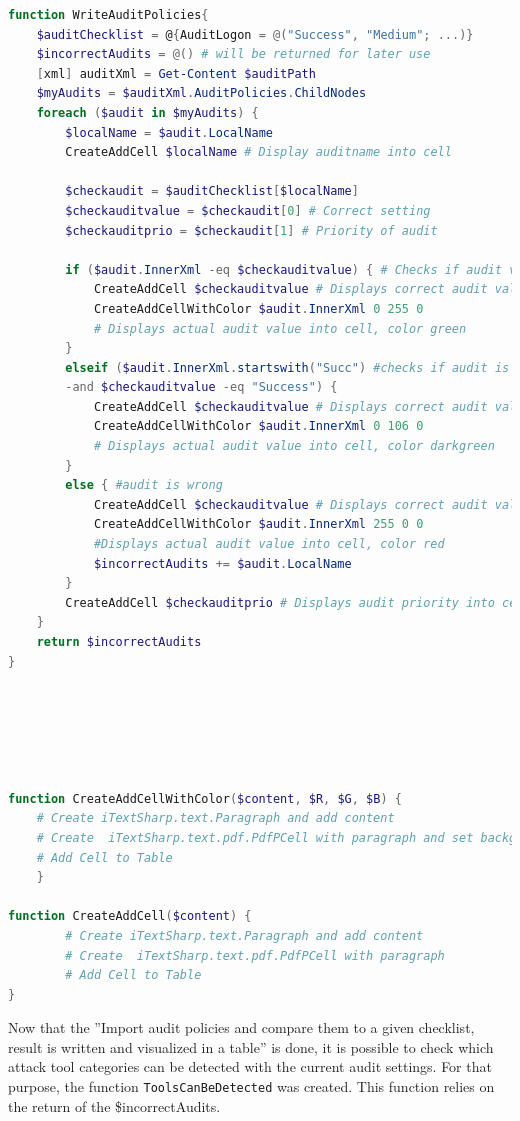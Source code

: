 \begin{lstlisting}[caption=Functions WriteAuditPolicies \& CreateAddCellWithColor \& CreateAddCell, language=PowerShell]
function WriteAuditPolicies{
    $auditChecklist = @{AuditLogon = @("Success", "Medium"; ...)}
    $incorrectAudits = @() # will be returned for later use
    [xml] auditXml = Get-Content $auditPath
    $myAudits = $auditXml.AuditPolicies.ChildNodes
    foreach ($audit in $myAudits) {
        $localName = $audit.LocalName
        CreateAddCell $localName # Display auditname into cell

        $checkaudit = $auditChecklist[$localName]
        $checkauditvalue = $checkaudit[0] # Correct setting
        $checkauditprio = $checkaudit[1] # Priority of audit

        if ($audit.InnerXml -eq $checkauditvalue) { # Checks if audit values are equal
            CreateAddCell $checkauditvalue # Displays correct audit value
            CreateAddCellWithColor $audit.InnerXml 0 255 0 
            # Displays actual audit value into cell, color green  
        }
        elseif ($audit.InnerXml.startswith("Succ") #checks if audit is ''overpowered''
        -and $checkauditvalue -eq "Success") {
            CreateAddCell $checkauditvalue # Displays correct audit value
            CreateAddCellWithColor $audit.InnerXml 0 106 0 
            # Displays actual audit value into cell, color darkgreen
        }
        else { #audit is wrong
            CreateAddCell $checkauditvalue # Displays correct audit value
            CreateAddCellWithColor $audit.InnerXml 255 0 0 
            #Displays actual audit value into cell, color red
            $incorrectAudits += $audit.LocalName
        }
        CreateAddCell $checkauditprio # Displays audit priority into cell
    }
    return $incorrectAudits
}






function CreateAddCellWithColor($content, $R, $G, $B) {
    # Create iTextSharp.text.Paragraph and add content
    # Create  iTextSharp.text.pdf.PdfPCell with paragraph and set backgroundcolor $R $G $B
    # Add Cell to Table
    }

function CreateAddCell($content) {
        # Create iTextSharp.text.Paragraph and add content
        # Create  iTextSharp.text.pdf.PdfPCell with paragraph
        # Add Cell to Table
}
\end{lstlisting}
Now that the ''Import audit policies and compare them to a given checklist, result is written and visualized in a table'' is done, it is possible to check which attack tool categories can be detected with the current audit settings. For that purpose, the function \lstinline|ToolsCanBeDetected| was created. This function relies on the return of the \$incorrectAudits.
